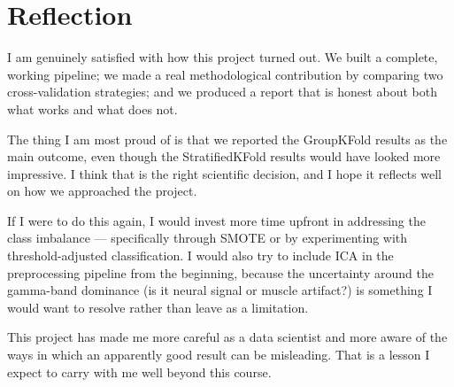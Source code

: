\documentclass[12pt,a4paper]{article}
\begin{document}
\section*{Reflection}

I am genuinely satisfied with how this project turned out. We built a complete, working pipeline; we made a real methodological contribution by comparing two cross-validation strategies; and we produced a report that is honest about both what works and what does not.

The thing I am most proud of is that we reported the GroupKFold results as the main outcome, even though the StratifiedKFold results would have looked more impressive. I think that is the right scientific decision, and I hope it reflects well on how we approached the project.

If I were to do this again, I would invest more time upfront in addressing the class imbalance --- specifically through SMOTE or by experimenting with threshold-adjusted classification. I would also try to include ICA in the preprocessing pipeline from the beginning, because the uncertainty around the gamma-band dominance (is it neural signal or muscle artifact?) is something I would want to resolve rather than leave as a limitation.

This project has made me more careful as a data scientist and more aware of the ways in which an apparently good result can be misleading. That is a lesson I expect to carry with me well beyond this course.
\end{document}
